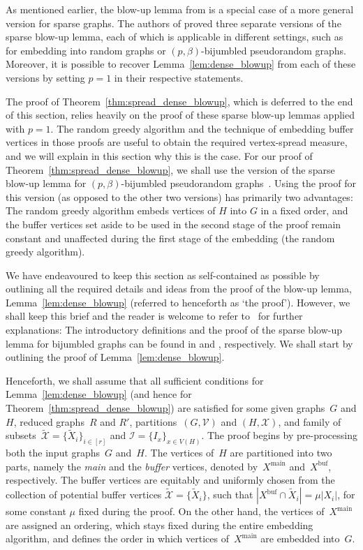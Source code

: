 \documentclass[final]{article}
\def\mcite[#1]#2{\mbox{\cite[#1]{#2}}}
\theoremstyle{definition}
\newcommand{\main}{\mathrm{main}}
\newcommand{\buf}{\mathrm{buf}}
\let\tilde\widetilde
\begin{document}
As mentioned earlier, the blow-up lemma from \cite{sparse_blowup} is a special case of a more general version for sparse graphs. The authors of \cite{sparse_blowup} proved three separate versions of the sparse blow-up lemma, each of which is applicable in different settings, such as for embedding into random graphs or $(p, \beta)$-bijumbled pseudorandom graphs. Moreover, it is possible to recover Lemma~\ref{lem:dense_blowup} from each of these versions by setting $p = 1$ in their respective statements. 

The proof of Theorem~\ref{thm:spread_dense_blowup}, which is deferred to the end of this section, relies heavily on the proof of these sparse blow-up lemmas applied with $p = 1$. The random greedy algorithm and the technique of embedding buffer vertices in those proofs are useful to obtain the required vertex-spread measure, and we will explain in this section why this is the case. 
For our proof of Theorem~\ref{thm:spread_dense_blowup}, we shall use the version of the sparse blow-up lemma for $(p, \beta)$-bijumbled pseudorandom graphs~\mcite[Lemma 1.25]{sparse_blowup}. Using the proof for this version (as opposed to the other two  versions) has primarily two advantages: The random greedy algorithm embeds vertices of $H$ into $G$ in a fixed order, and the buffer vertices set aside to be used in the second stage of the proof remain constant and unaffected during the first stage of the embedding (the random greedy algorithm).

We have endeavoured to keep this section as self-contained as possible by outlining all the required details and ideas from the proof of the blow-up lemma, Lemma~\ref{lem:dense_blowup} (referred to henceforth as `the proof'). However, we shall keep this brief and the reader is welcome to refer to~\cite{sparse_blowup} for  further explanations: The introductory definitions and the proof of the sparse blow-up lemma for bijumbled graphs can be found in \mcite[Chapter 1]{sparse_blowup} and \mcite[Chapter 4]{sparse_blowup}, respectively. We shall start by outlining the proof of Lemma~\ref{lem:dense_blowup}. 

Henceforth, we shall assume that all sufficient conditions for Lemma~\ref{lem:dense_blowup} (and hence for Theorem~\ref{thm:spread_dense_blowup}) are satisfied for some given graphs~$G$ and $H$, reduced graphs~$R$ and $R'$, partitions~$(G, \mathcal{V})$ and $(H, \mathcal{X})$, and family of subsets~$\tilde{\mathcal{X}} = \{\tilde{X}_i\}_{i \in [r]}$ and $\mathcal{I} = \{I_x\}_{x \in V(H)}$. 
The proof begins by pre-processing both the input graphs~$G$ and~$H$. 
The vertices of~$H$ are partitioned into two parts, namely the \emph{main} and the \emph{buffer} vertices, denoted by~$X^{\main}$ and~$X^{\buf}$, respectively. 
The buffer vertices are equitably and uniformly chosen from the collection of potential buffer vertices $\tilde{\mathcal{X}} = \{\tilde{X}_i\}$, 
such that $|X^{\buf} \cap \tilde{X}_i| = \mu|X_i|$, for some constant $\mu$ fixed during the proof. On the other hand, the vertices of~$X^{\main}$ are assigned an ordering, which stays fixed during the entire embedding algorithm, 
and defines the order in which vertices of~$X^{\main}$ are embedded into~$G$. 
\end{document}
